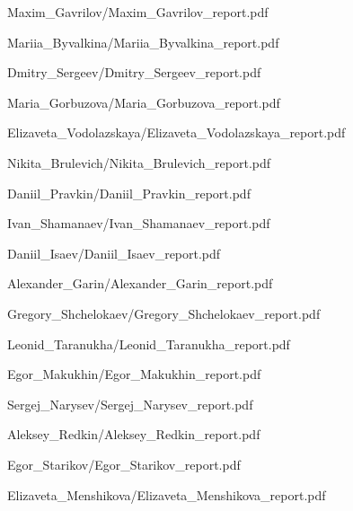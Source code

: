 \documentclass[a4paper]{article}
\begin{document}
{Maxim_Gavrilov/Maxim_Gavrilov_report.pdf}

{Mariia_Byvalkina/Mariia_Byvalkina_report.pdf}

{Dmitry_Sergeev/Dmitry_Sergeev_report.pdf}

{Maria_Gorbuzova/Maria_Gorbuzova_report.pdf}

{Elizaveta_Vodolazskaya/Elizaveta_Vodolazskaya_report.pdf}

{Nikita_Brulevich/Nikita_Brulevich_report.pdf}

{Daniil_Pravkin/Daniil_Pravkin_report.pdf}

{Ivan_Shamanaev/Ivan_Shamanaev_report.pdf}

{Daniil_Isaev/Daniil_Isaev_report.pdf}

{Alexander_Garin/Alexander_Garin_report.pdf}

{Gregory_Shchelokaev/Gregory_Shchelokaev_report.pdf}

{Leonid_Taranukha/Leonid_Taranukha_report.pdf}

{Egor_Makukhin/Egor_Makukhin_report.pdf}

{Sergej_Narysev/Sergej_Narysev_report.pdf}

{Aleksey_Redkin/Aleksey_Redkin_report.pdf}

{Egor_Starikov/Egor_Starikov_report.pdf}

{Elizaveta_Menshikova/Elizaveta_Menshikova_report.pdf}
\end{document}
